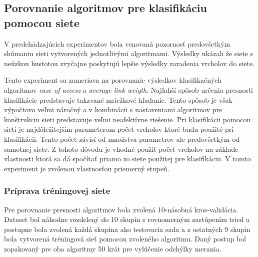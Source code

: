 \documentclass[slovak,master,dept460,male,cpp,cpdeclaration]{diploma}
\begin{document}
\subsection{Porovnanie algoritmov pre klasifikáciu pomocou siete}
V predchádzajúcich experimentov bola venovaná pozornosť predovšetkým skúmaniu sieti vytvorených jednotlivými algoritmami. Výsledky ukázali že siete s neúzkou hustotou zvyčajne poskytujú lepšie výsledky zaradenia vrcholov do siete.

Tento experiment sa zameriava na porovnanie výsledkov klasifikačných algoritmov \textit{ease of access} a \textit{average link weigth}. Najľahší spôsob určenia presnosti klasifikácie predstavuje takzvané mriežkové hľadanie. Tento spôsob je však výpočtovo veľmi náročný a v kombinácii s nastaveniami algoritmov pre konštrukciu sieti predstavuje veľmi neafektívne riešenie. Pri klasifikácii pomocou sieti je najdôležitejším parameterom počet vrcholov ktoré budu použité pri klasifikácii. Tento počet závisí od množstva parametrov ale predovšetkým od samotnej siete. Z tohoto dôvodu je vhodné použiť počet vrcholov na základe vlastnosti ktorá sa dá spočítať priamo zo siete použitej pre klasifikáciu. V tomto experiment je zvolenou vlastnosťou priemerný stupeň.

\subsubsection{Príprava tréningovej siete}
Pre porovnanie presnosti algoritmov bola zvolená 10-násobná kros-validácia. Dataset bol náhodne rozdelený do 10 skupín s rovnomerným zastúpením tried a postupne bola zvolená každá skupina ako testovacia sada a z ostatných 9 skupín bola vytvorená tréningová sieť pomocou zvoleného algoritmu. Daný postup bol zopakovaný pre oba algoritmy 50 krát pre vylúčenie odchýlky merania.
\end{document}
